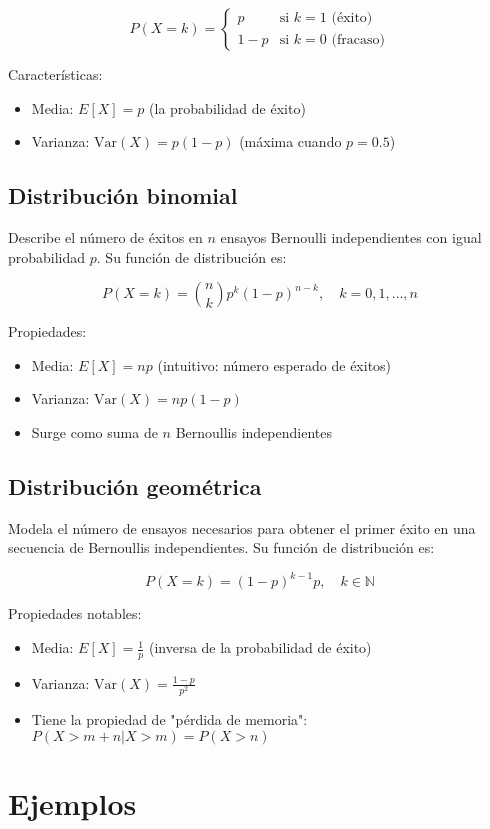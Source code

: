 \documentclass[letterpaper, 12pt]{article}
\begin{document}
	\[ P(X = k) = \begin{cases}
		p & \text{si } k = 1 \text{ (éxito)} \\
		1-p & \text{si } k = 0 \text{ (fracaso)}
	\end{cases} \]
	
	Características:
	\begin{itemize}
		\item Media: $E[X] = p$ (la probabilidad de éxito)
		\item Varianza: $\text{Var}(X) = p(1-p)$ (máxima cuando $p=0.5$)
	\end{itemize}
	
	\subsection{Distribución binomial}
	Describe el número de éxitos en $n$ ensayos Bernoulli independientes con igual probabilidad $p$. Su función de distribución es:
	
	\[ P(X = k) = \binom{n}{k} p^k (1-p)^{n-k}, \quad k = 0,1,\dots,n \]
	
	Propiedades:
	\begin{itemize}
		\item Media: $E[X] = np$ (intuitivo: número esperado de éxitos)
		\item Varianza: $\text{Var}(X) = np(1-p)$
		\item Surge como suma de $n$ Bernoullis independientes
	\end{itemize}
	
	\subsection{Distribución geométrica}
	Modela el número de ensayos necesarios para obtener el primer éxito en una secuencia de Bernoullis independientes. Su función de distribución es:
	
	\[ P(X = k) = (1-p)^{k-1} p, \quad k \in \mathbb{N} \]
	
	Propiedades notables:
	\begin{itemize}
		\item Media: $E[X] = \frac{1}{p}$ (inversa de la probabilidad de éxito)
		\item Varianza: $\text{Var}(X) = \frac{1-p}{p^2}$
		\item Tiene la propiedad de "pérdida de memoria": $P(X > m+n | X > m) = P(X > n)$
	\end{itemize}
	
	\section{Ejemplos}
	
\end{document}
